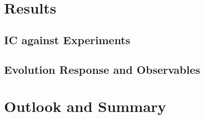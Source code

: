 \documentclass[aps,prl,twocolumn,groupedaddress]{revtex4-1}
\begin{document}
	
\section{Results}
	\subsection{IC against Experiments}
	\subsection{Evolution Response and Observables}
\section{Outlook and Summary}

%


\end{document}
